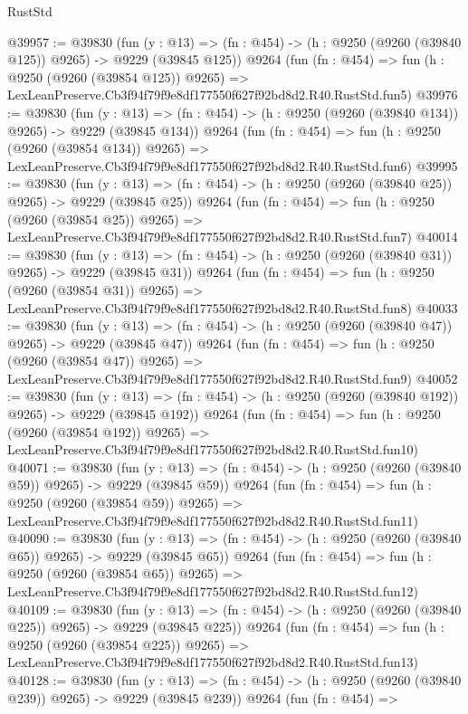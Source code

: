 \begin{lexlean}{RustStd}
\begin{coremodule}
@39957 := @39830
    (fun (y : @13) => (fn : @454) -> (h : @9250 (@9260 (@39840 @125)) @9265) -> @9229 (@39845 @125))
    @9264
    (fun (fn : @454) =>
    fun (h : @9250 (@9260 (@39854 @125)) @9265) =>
    LexLeanPreserve.Cb3f94f79f9e8df177550f627f92bd8d2.R40.RustStd.fun5)
@39976 := @39830
    (fun (y : @13) => (fn : @454) -> (h : @9250 (@9260 (@39840 @134)) @9265) -> @9229 (@39845 @134))
    @9264
    (fun (fn : @454) =>
    fun (h : @9250 (@9260 (@39854 @134)) @9265) =>
    LexLeanPreserve.Cb3f94f79f9e8df177550f627f92bd8d2.R40.RustStd.fun6)
@39995 := @39830
    (fun (y : @13) => (fn : @454) -> (h : @9250 (@9260 (@39840 @25)) @9265) -> @9229 (@39845 @25))
    @9264
    (fun (fn : @454) =>
    fun (h : @9250 (@9260 (@39854 @25)) @9265) =>
    LexLeanPreserve.Cb3f94f79f9e8df177550f627f92bd8d2.R40.RustStd.fun7)
@40014 := @39830
    (fun (y : @13) => (fn : @454) -> (h : @9250 (@9260 (@39840 @31)) @9265) -> @9229 (@39845 @31))
    @9264
    (fun (fn : @454) =>
    fun (h : @9250 (@9260 (@39854 @31)) @9265) =>
    LexLeanPreserve.Cb3f94f79f9e8df177550f627f92bd8d2.R40.RustStd.fun8)
@40033 := @39830
    (fun (y : @13) => (fn : @454) -> (h : @9250 (@9260 (@39840 @47)) @9265) -> @9229 (@39845 @47))
    @9264
    (fun (fn : @454) =>
    fun (h : @9250 (@9260 (@39854 @47)) @9265) =>
    LexLeanPreserve.Cb3f94f79f9e8df177550f627f92bd8d2.R40.RustStd.fun9)
@40052 := @39830
    (fun (y : @13) => (fn : @454) -> (h : @9250 (@9260 (@39840 @192)) @9265) -> @9229 (@39845 @192))
    @9264
    (fun (fn : @454) =>
    fun (h : @9250 (@9260 (@39854 @192)) @9265) =>
    LexLeanPreserve.Cb3f94f79f9e8df177550f627f92bd8d2.R40.RustStd.fun10)
@40071 := @39830
    (fun (y : @13) => (fn : @454) -> (h : @9250 (@9260 (@39840 @59)) @9265) -> @9229 (@39845 @59))
    @9264
    (fun (fn : @454) =>
    fun (h : @9250 (@9260 (@39854 @59)) @9265) =>
    LexLeanPreserve.Cb3f94f79f9e8df177550f627f92bd8d2.R40.RustStd.fun11)
@40090 := @39830
    (fun (y : @13) => (fn : @454) -> (h : @9250 (@9260 (@39840 @65)) @9265) -> @9229 (@39845 @65))
    @9264
    (fun (fn : @454) =>
    fun (h : @9250 (@9260 (@39854 @65)) @9265) =>
    LexLeanPreserve.Cb3f94f79f9e8df177550f627f92bd8d2.R40.RustStd.fun12)
@40109 := @39830
    (fun (y : @13) => (fn : @454) -> (h : @9250 (@9260 (@39840 @225)) @9265) -> @9229 (@39845 @225))
    @9264
    (fun (fn : @454) =>
    fun (h : @9250 (@9260 (@39854 @225)) @9265) =>
    LexLeanPreserve.Cb3f94f79f9e8df177550f627f92bd8d2.R40.RustStd.fun13)
@40128 := @39830
    (fun (y : @13) => (fn : @454) -> (h : @9250 (@9260 (@39840 @239)) @9265) -> @9229 (@39845 @239))
    @9264
    (fun (fn : @454) =>

\end{coremodule}
\end{lexlean}
